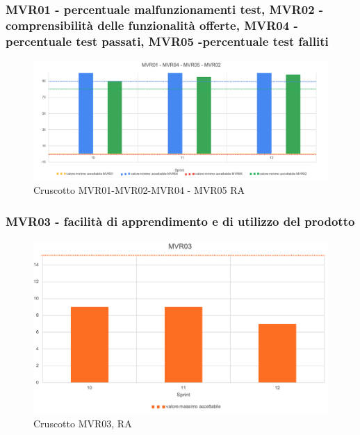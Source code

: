 \subsubsection*{MVR01 - percentuale malfunzionamenti test, MVR02 - comprensibilità delle funzionalità offerte, MVR04 -percentuale test passati, MVR05 -percentuale test falliti }

\begin{figure}[H] 
    \centering
    \includegraphics[scale = 0.5]{immagini/ImmRA/Mvr01020405.png}
    \caption{Cruscotto MVR01-MVR02-MVR04 - MVR05 RA}
\end{figure}

\subsubsection*{MVR03 - facilità di apprendimento e di utilizzo del prodotto}

\begin{figure}[H] 
    \centering
    \includegraphics[scale = 0.7]{immagini/ImmRA/MVR03.png}
    \caption{Cruscotto MVR03, RA}
\end{figure}
